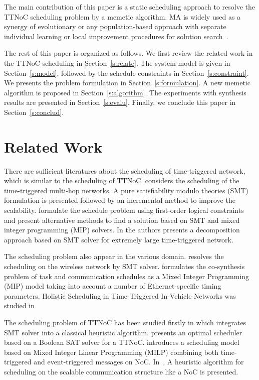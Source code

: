 \documentclass[journal]{IEEEtran}
\theoremstyle{remark}
\begin{document}
The main contribution of this paper is a static scheduling approach to resolve the TTNoC scheduling problem by a memetic algorithm. 
MA is widely used as a synergy of evolutionary or any population-based approach with separate individual learning or local improvement procedures for solution search~\cite{DBLP:journals/tec/ChenOLT11}. 

The rest of this paper is organized as follows. 
We first review the related work in the TTNoC scheduling in Section~\ref{s:relate}. 
The system model is given in Section~\ref{s:model},
 followed by the schedule constraints in Section~\ref{s:constraint}.
We presents the problem formulation in Section~\ref{s:formulation}.
A new memetic algorithm is proposed in Section~\ref{s:algorithm}.
The experiments with synthesis results are presented in Section~\ref{s:evalu}.
Finally, we conclude this paper in Section~\ref{s:conclud}.

\section{Related Work	\label{s:relate}}

There are sufficient literatures about the scheduling of time-triggered network,
 which is similar to the scheduling of TTNoC. 
\cite{DBLP:conf/rtss/Steiner10} considers the scheduling of the time-triggered multi-hop networks.
A pure satisfiability modulo theories (SMT) formulation is presented followed by an incremental method to improve the scalability.
\cite{DBLP:journals/rts/CraciunasO16,DBLP:conf/rtns/CraciunasO14} formulate the schedule problem using first-order logical constraints and present alternative methods to find a solution based on SMT and mixed integer programming (MIP) solvers.
In \cite{DBLP:conf/etfa/PozoSRH15} the authors presents a decomposition approach based on SMT solver for extremely large time-triggered network.

The scheduling problem also appear in the various domain.
\cite{DBLP:conf/isorc/RoRM15} resolves the scheduling on the wireless network by SMT solver.
\cite{DBLP:conf/aspdac/ZhangG0C14} formulates the co-synthesis problem of task and communication schedules as a Mixed Integer Programming (MIP) model taking into account a number of Ethernet-specific timing parameters.
Holistic Scheduling in Time-Triggered In-Vehicle Networks was studied in~\cite{DBLP:journals/tii/HuLWLZ14}

The scheduling problem of TTNoC has been
studied firstly in \cite{DBLP:conf/date/HuangBRBK12} which integrates SMT solver into a classical heuristic algorithm. 
\cite{DBLP:conf/sies/ScholerKMO15} presents an optimal scheduler based on a Boolean SAT solver for a TTNoC.
\cite{DBLP:conf/indin/MurshedOAK15} introduces a scheduling model based on Mixed Integer Linear Programming (MILP) combining both time-triggered and event-triggered messages on NoC.
In~\cite{DBLP:conf/sies/FreierC15},
 A heuristic algorithm for scheduling on the scalable communication structure like a NoC is presented. 
\end{document}
